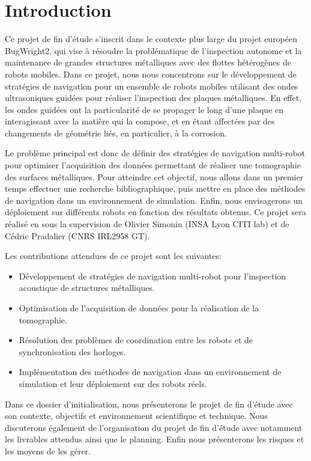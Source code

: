 \documentclass[init,francais,RandD]{rapportPFE}  %
\begin{document}
	\section{Introduction}
		Ce projet de fin d'étude s'inscrit dans le contexte plus large du projet européen BugWright2, qui vise à résoudre la problématique de l'inspection autonome et la maintenance de grandes structures métalliques avec des flottes hétérogènes de robots mobiles. Dans ce projet, nous nous concentrons sur le développement de stratégies de navigation pour un ensemble de robots mobiles utilisant des ondes ultrasoniques guidées pour réaliser l'inspection des plaques métalliques. En effet, les ondes guidées ont la particularité de se propager le long d'une plaque en interagissant avec la matière qui la compose, et en étant affectées par des changements de géométrie liés, en particulier, à la corrosion.

		Le problème principal est donc de définir des stratégies de navigation multi-robot pour optimiser l'acquisition des données permettant de réaliser une tomographie des surfaces métalliques. Pour atteindre cet objectif, nous allons dans un premier temps effectuer une recherche bibliographique, puis mettre en place des méthodes de navigation dans un environnement de simulation. Enfin, nous envisagerons un déploiement sur différents robots en fonction des résultats obtenus. Ce projet sera réalisé en sous la supervision de Olivier Simonin (INSA Lyon CITI lab) et de Cédric Pradalier (CNRS IRL2958 GT).

		Les contributions attendues de ce projet sont les suivantes:
		\begin{itemize}
			\item Développement de stratégies de navigation multi-robot pour l'inspection acoustique de structures métalliques.
			\item Optimisation de l'acquisition de données pour la réalisation de la tomographie.
			\item Résolution des problèmes de coordination entre les robots et de synchronisation des horloges.
			\item Implémentation des méthodes de navigation dans un environnement de simulation et leur déploiement sur des robots réels.
		\end{itemize}

		Dans ce dossier d'initialisation, nous présenterons le projet de fin d'étude avec son contexte, objectifs et environnement scientifique et technique. Nous discuterons également de l'organisation du projet de fin d'étude avec notamment les livrables attendus ainsi que le planning. Enfin nous présenterons les risques et les moyens de les gérer.
\end{document}
